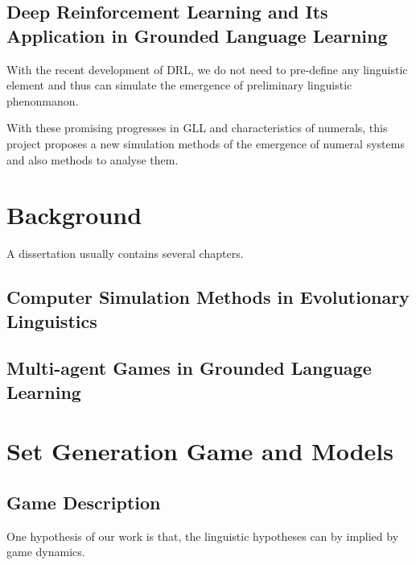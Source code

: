 \documentclass[msc,deptreport]{infthesis} %
\begin{document}
\section{Deep Reinforcement Learning and Its Application in Grounded Language Learning}
\label{sec1.2:DRL_GLL}

With the recent development of DRL, we do not need to pre-define any linguistic element and thus can simulate the emergence of preliminary linguistic phenonmanon.

With these promising progresses in GLL and characteristics of numerals, this project proposes a new simulation methods of the emergence of numeral systems and also methods to analyse them.


\chapter{Background}
\label{ch2:background}

A dissertation usually contains several chapters.

\section{Computer Simulation Methods in Evolutionary Linguistics}
\label{sec2.1:evolang}

\section{Multi-agent Games in Grounded Language Learning}
\label{sec2.2:gll}




\chapter{Set Generation Game and Models}
\label{ch3:game_model}

\section{Game Description}
\label{sec3.1:game_description}

One hypothesis of our work is that, the linguistic hypotheses can by implied by game dynamics.
\end{document}
